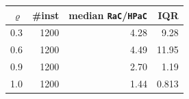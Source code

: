 \begin{tabular}{@{}rrrr@{}}
\toprule
$\varrho$ & \#inst & median \texttt{RaC}/\texttt{HPaC} & IQR \\
\midrule
0.3 & 1200 & 4.28 & 9.28 \\
0.6 & 1200 & 4.49 & 11.95 \\
0.9 & 1200 & 2.70 & 1.19 \\
1.0 & 1200 & 1.44 & 0.813 \\
\bottomrule
\end{tabular}
